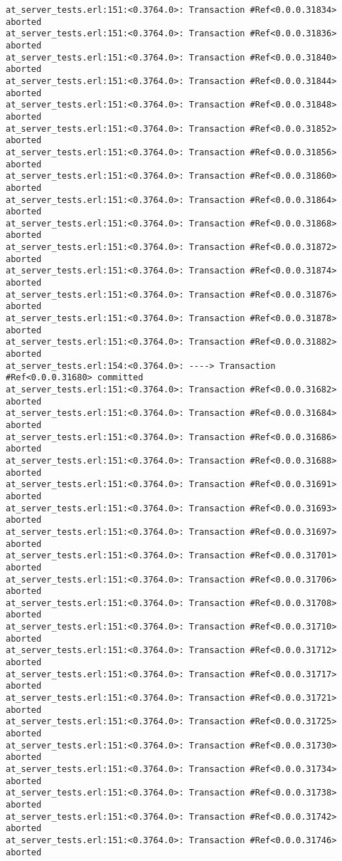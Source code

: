 \documentclass[
paper=a4,
oneside,
fontsize=11pt,
numbers=noenddot,
headinclude=false, %
footinclude=false, %
fleqn,             %
DIV=8
]{scrartcl}
\begin{document}
\begin{lstlisting}[caption=Session output: {\tt
    commit\_t\_competing\_test()} (debug enabled),
  label=lst:testoutextapi, basicstyle=\ttfamily\scriptsize]
at_server_tests.erl:151:<0.3764.0>: Transaction #Ref<0.0.0.31834> aborted
at_server_tests.erl:151:<0.3764.0>: Transaction #Ref<0.0.0.31836> aborted
at_server_tests.erl:151:<0.3764.0>: Transaction #Ref<0.0.0.31840> aborted
at_server_tests.erl:151:<0.3764.0>: Transaction #Ref<0.0.0.31844> aborted
at_server_tests.erl:151:<0.3764.0>: Transaction #Ref<0.0.0.31848> aborted
at_server_tests.erl:151:<0.3764.0>: Transaction #Ref<0.0.0.31852> aborted
at_server_tests.erl:151:<0.3764.0>: Transaction #Ref<0.0.0.31856> aborted
at_server_tests.erl:151:<0.3764.0>: Transaction #Ref<0.0.0.31860> aborted
at_server_tests.erl:151:<0.3764.0>: Transaction #Ref<0.0.0.31864> aborted
at_server_tests.erl:151:<0.3764.0>: Transaction #Ref<0.0.0.31868> aborted
at_server_tests.erl:151:<0.3764.0>: Transaction #Ref<0.0.0.31872> aborted
at_server_tests.erl:151:<0.3764.0>: Transaction #Ref<0.0.0.31874> aborted
at_server_tests.erl:151:<0.3764.0>: Transaction #Ref<0.0.0.31876> aborted
at_server_tests.erl:151:<0.3764.0>: Transaction #Ref<0.0.0.31878> aborted
at_server_tests.erl:151:<0.3764.0>: Transaction #Ref<0.0.0.31882> aborted
at_server_tests.erl:154:<0.3764.0>: ----> Transaction #Ref<0.0.0.31680> committed
at_server_tests.erl:151:<0.3764.0>: Transaction #Ref<0.0.0.31682> aborted
at_server_tests.erl:151:<0.3764.0>: Transaction #Ref<0.0.0.31684> aborted
at_server_tests.erl:151:<0.3764.0>: Transaction #Ref<0.0.0.31686> aborted
at_server_tests.erl:151:<0.3764.0>: Transaction #Ref<0.0.0.31688> aborted
at_server_tests.erl:151:<0.3764.0>: Transaction #Ref<0.0.0.31691> aborted
at_server_tests.erl:151:<0.3764.0>: Transaction #Ref<0.0.0.31693> aborted
at_server_tests.erl:151:<0.3764.0>: Transaction #Ref<0.0.0.31697> aborted
at_server_tests.erl:151:<0.3764.0>: Transaction #Ref<0.0.0.31701> aborted
at_server_tests.erl:151:<0.3764.0>: Transaction #Ref<0.0.0.31706> aborted
at_server_tests.erl:151:<0.3764.0>: Transaction #Ref<0.0.0.31708> aborted
at_server_tests.erl:151:<0.3764.0>: Transaction #Ref<0.0.0.31710> aborted
at_server_tests.erl:151:<0.3764.0>: Transaction #Ref<0.0.0.31712> aborted
at_server_tests.erl:151:<0.3764.0>: Transaction #Ref<0.0.0.31717> aborted
at_server_tests.erl:151:<0.3764.0>: Transaction #Ref<0.0.0.31721> aborted
at_server_tests.erl:151:<0.3764.0>: Transaction #Ref<0.0.0.31725> aborted
at_server_tests.erl:151:<0.3764.0>: Transaction #Ref<0.0.0.31730> aborted
at_server_tests.erl:151:<0.3764.0>: Transaction #Ref<0.0.0.31734> aborted
at_server_tests.erl:151:<0.3764.0>: Transaction #Ref<0.0.0.31738> aborted
at_server_tests.erl:151:<0.3764.0>: Transaction #Ref<0.0.0.31742> aborted
at_server_tests.erl:151:<0.3764.0>: Transaction #Ref<0.0.0.31746> aborted

\end{lstlisting}
\end{document}
